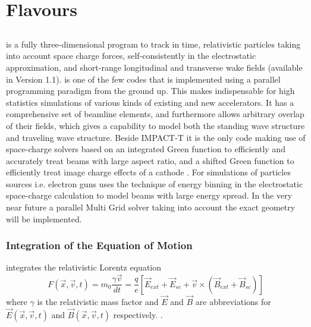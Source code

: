 \chapter{\opal Flavours}
\label{sec:opalFlavours}

\section{\opalt}
\opalt is a fully three-dimensional program to track in time, relativistic particles taking into account space charge forces, self-consistently in the electrostatic approximation, and short-range longitudinal and transverse wake fields (available in Version 1.1). \opalt  is one of the few
codes  that is implemented using a parallel programming paradigm from the ground up. This makes \opalt indispensable for
high statistics simulations of various kinds of existing and new accelerators. It has a comprehensive set of beamline
elements, and furthermore allows arbitrary overlap of their fields, which gives \opalt a capability
to model both the standing wave structure and traveling wave structure. Beside IMPACT-T it is the only code making use of
space-charge solvers based on an integrated Green \cite{qiang2005} function to efficiently and accurately treat beams with
large aspect ratio, and a shifted Green function to efficiently treat image charge effects of a cathode \cite{fubiani2006,qiang2006-2}. 
For simulations of particles sources i.e. electron guns \opalt uses the technique of  energy binning in the electrostatic space-charge calculation to model beams with large
energy spread. In the very near future a parallel Multi Grid solver taking into account the exact geometry will be implemented.  

\subsection{Integration of the Equation of Motion}
\opalt integrates the relativistic Lorentz equation
\begin{equation}
F(\vec{x},\vec{v},t) = m_0 \frac{\gamma \vec{v}}{dt} =   \frac{q}{e}[\vec{E}_{ext} + \vec{E}_{sc} + \vec{v} \times (\vec{B}_{ext} + \vec{B}_{sc})]
\end{equation}
where $\gamma$ is the relativistic mass factor and $\vec{E}$  and $\vec{B}$ are abbreviations for $\vec{E}(\vec{x},\vec{v},t)$ and $\vec{B}(\vec{x},\vec{v},t)$
respectively. \latermore .


